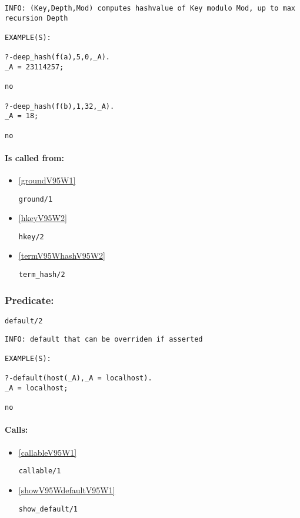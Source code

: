 {\small \begin{verbatim}
INFO: (Key,Depth,Mod) computes hashvalue of Key modulo Mod, up to max recursion Depth

EXAMPLE(S):

?-deep_hash(f(a),5,0,_A).
_A = 23114257;

no

?-deep_hash(f(b),1,32,_A).
_A = 18;

no

\end{verbatim}}
\paragraph{Is called from:} 
\begin{itemize}
\item \ref{groundV95W1} 
\begin{verbatim}
ground/1
\end{verbatim}

\item \ref{hkeyV95W2} 
\begin{verbatim}
hkey/2
\end{verbatim}

\item \ref{termV95WhashV95W2} 
\begin{verbatim}
term_hash/2
\end{verbatim}

\end{itemize}

\subsubsection{Predicate:} \label{defaultV95W2}

\begin{verbatim}
default/2
\end{verbatim}

{\small \begin{verbatim}
INFO: default that can be overriden if asserted

EXAMPLE(S):

?-default(host(_A),_A = localhost).
_A = localhost;

no

\end{verbatim}}
\paragraph{Calls:} 
\begin{itemize}
\item \ref{callableV95W1} 
\begin{verbatim}
callable/1
\end{verbatim}

\item \ref{showV95WdefaultV95W1} 
\begin{verbatim}
show_default/1
\end{verbatim}

\end{itemize}
